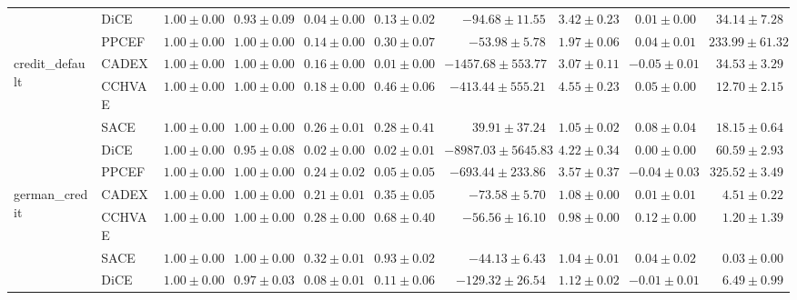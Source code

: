 \begin{table}[ht]
\begin{center}
\begin{sc}
\begin{scriptsize}
\begin{tabular}{l|l|rrrrrrrr}
 & DiCE & $\boldsymbol{1.00\pm{0.00}}$ & $0.93\pm{0.09}$ & $0.04\pm{0.00}$ & $0.13\pm{0.02}$ & $-94.68\pm{11.55}$ & $3.42\pm{0.23}$ & $0.01\pm{0.00}$ & $34.14\pm{7.28}$ \\
 & PPCEF & $\boldsymbol{1.00\pm{0.00}}$ & $\boldsymbol{1.00\pm{0.00}}$ & $0.14\pm{0.00}$ & $0.30\pm{0.07}$ & $-53.98\pm{5.78}$ & $1.97\pm{0.06}$ & $0.04\pm{0.01}$ & $233.99\pm{61.32}$ \\
\midrule
\multirow{5}{*}{credit\_default} & CADEX & $\boldsymbol{1.00\pm{0.00}}$ & $\boldsymbol{1.00\pm{0.00}}$ & $0.16\pm{0.00}$ & $0.01\pm{0.00}$ & $-1457.68\pm{553.77}$ & $3.07\pm{0.11}$ & $-0.05\pm{0.01}$ & $34.53\pm{3.29}$ \\
 & CCHVAE & $\boldsymbol{1.00\pm{0.00}}$ & $\boldsymbol{1.00\pm{0.00}}$ & $0.18\pm{0.00}$ & $\boldsymbol{0.46\pm{0.06}}$ & $-413.44\pm{555.21}$ & $4.55\pm{0.23}$ & $0.05\pm{0.00}$ & $\boldsymbol{12.70\pm{2.15}}$ \\
 & SACE & $\boldsymbol{1.00\pm{0.00}}$ & $\boldsymbol{1.00\pm{0.00}}$ & $\boldsymbol{0.26\pm{0.01}}$ & $0.28\pm{0.41}$ & $\boldsymbol{39.91\pm{37.24}}$ & $\boldsymbol{1.05\pm{0.02}}$ & $\boldsymbol{0.08\pm{0.04}}$ & $18.15\pm{0.64}$ \\
 & DiCE & $\boldsymbol{1.00\pm{0.00}}$ & $0.95\pm{0.08}$ & $0.02\pm{0.00}$ & $0.02\pm{0.01}$ & $-8987.03\pm{5645.83}$ & $4.22\pm{0.34}$ & $0.00\pm{0.00}$ & $60.59\pm{2.93}$ \\
 & PPCEF & $\boldsymbol{1.00\pm{0.00}}$ & $\boldsymbol{1.00\pm{0.00}}$ & $0.24\pm{0.02}$ & $0.05\pm{0.05}$ & $-693.44\pm{233.86}$ & $3.57\pm{0.37}$ & $-0.04\pm{0.03}$ & $325.52\pm{3.49}$ \\
\midrule
\multirow{5}{*}{german\_credit} & CADEX & $\boldsymbol{1.00\pm{0.00}}$ & $\boldsymbol{1.00\pm{0.00}}$ & $0.21\pm{0.01}$ & $0.35\pm{0.05}$ & $-73.58\pm{5.70}$ & $1.08\pm{0.00}$ & $0.01\pm{0.01}$ & $4.51\pm{0.22}$ \\
 & CCHVAE & $\boldsymbol{1.00\pm{0.00}}$ & $\boldsymbol{1.00\pm{0.00}}$ & $0.28\pm{0.00}$ & $0.68\pm{0.40}$ & $-56.56\pm{16.10}$ & $\boldsymbol{0.98\pm{0.00}}$ & $\boldsymbol{0.12\pm{0.00}}$ & $1.20\pm{1.39}$ \\
 & SACE & $\boldsymbol{1.00\pm{0.00}}$ & $\boldsymbol{1.00\pm{0.00}}$ & $\boldsymbol{0.32\pm{0.01}}$ & $\boldsymbol{0.93\pm{0.02}}$ & $\boldsymbol{-44.13\pm{6.43}}$ & $1.04\pm{0.01}$ & $0.04\pm{0.02}$ & $\boldsymbol{0.03\pm{0.00}}$ \\
 & DiCE & $\boldsymbol{1.00\pm{0.00}}$ & $0.97\pm{0.03}$ & $0.08\pm{0.01}$ & $0.11\pm{0.06}$ & $-129.32\pm{26.54}$ & $1.12\pm{0.02}$ & $-0.01\pm{0.01}$ & $6.49\pm{0.99}$ \\

\end{tabular}
\end{scriptsize}
\end{sc}
\end{center}
\end{table}
